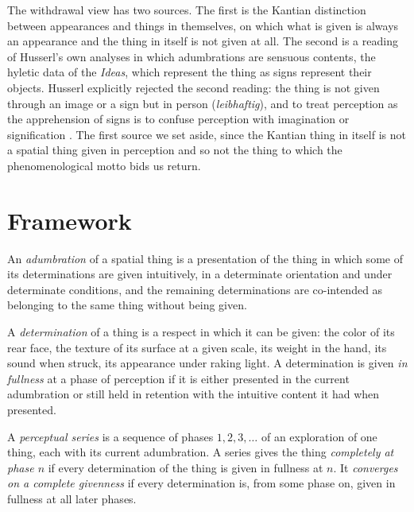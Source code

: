 \documentclass{situationist-preprint}
\begin{document}
The withdrawal view has two sources. The first is the Kantian distinction between appearances and things in themselves, on which what is given is always an appearance and the thing in itself is not given at all. The second is a reading of Husserl's own analyses in which adumbrations are sensuous contents, the hyletic data of the \emph{Ideas}, which represent the thing as signs represent their objects. Husserl explicitly rejected the second reading: the thing is not given through an image or a sign but in person (\emph{leibhaftig}), and to treat perception as the apprehension of signs is to confuse perception with imagination or signification \citep[§§43, 52]{Husserl1913}. The first source we set aside, since the Kantian thing in itself is not a spatial thing given in perception and so not the thing to which the phenomenological motto bids us return.

\section{Framework}\label{s:framework}

\begin{definition}\label{d:adumbration}
An \emph{adumbration} of a spatial thing is a presentation of the thing in which some of its determinations are given intuitively, in a determinate orientation and under determinate conditions, and the remaining determinations are co-intended as belonging to the same thing without being given.
\end{definition}

\begin{definition}\label{d:determinable}
A \emph{determination} of a thing is a respect in which it can be given: the color of its rear face, the texture of its surface at a given scale, its weight in the hand, its sound when struck, its appearance under raking light. A determination is given \emph{in fullness} at a phase of perception if it is either presented in the current adumbration or still held in retention with the intuitive content it had when presented.
\end{definition}

\begin{definition}\label{d:series}
A \emph{perceptual series} is a sequence of phases $1, 2, 3, \dots$ of an exploration of one thing, each with its current adumbration. A series gives the thing \emph{completely at phase $n$} if every determination of the thing is given in fullness at $n$. It \emph{converges on a complete givenness} if every determination is, from some phase on, given in fullness at all later phases.
\end{definition}
\end{document}
